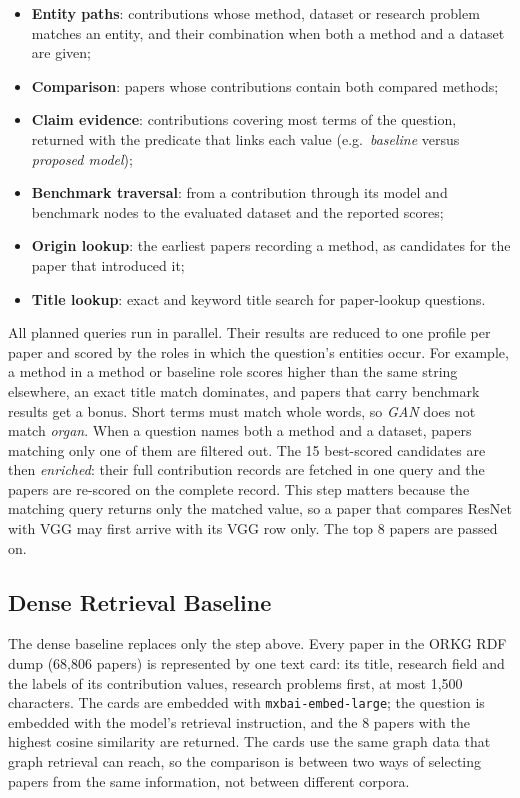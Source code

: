 \begin{itemize}
\item \textbf{Entity paths}: contributions whose method, dataset or research
  problem matches an entity, and their combination when both a method and a
  dataset are given;
\item \textbf{Comparison}: papers whose contributions contain both compared
  methods;
\item \textbf{Claim evidence}: contributions covering most terms of the
  question, returned with the predicate that links each value (e.g.\
  \emph{baseline} versus \emph{proposed model});
\item \textbf{Benchmark traversal}: from a contribution through its model and
  benchmark nodes to the evaluated dataset and the reported scores;
\item \textbf{Origin lookup}: the earliest papers recording a method, as
  candidates for the paper that introduced it;
\item \textbf{Title lookup}: exact and keyword title search for paper-lookup
  questions.
\end{itemize}

All planned queries run in parallel. Their results are reduced to one
profile per paper and scored by the roles in which the question's entities
occur. For example, a method in a method or baseline role scores higher than
the same string elsewhere, an exact title match dominates, and papers that
carry benchmark results get a bonus. Short terms must match whole words, so
\emph{GAN} does not match \emph{organ}. When a question names both a method and
a dataset, papers matching only one of them are filtered out. The 15
best-scored candidates are then \emph{enriched}: their full contribution
records are fetched in one query and the papers are re-scored on the complete
record. This step matters because the matching query returns only the matched
value, so a paper that compares ResNet with VGG may first arrive with its VGG
row only. The top 8 papers are passed on.

\subsection{Dense Retrieval Baseline}

The dense baseline replaces only the step above. Every paper in the ORKG RDF dump
(68,806 papers) is represented by one text card: its title, research field
and the labels of its contribution values, research problems first, at most
1,500 characters. The cards are embedded with \texttt{mxbai-embed-large};
the question is embedded with the model's retrieval instruction, and the 8
papers with the highest cosine similarity are returned. The cards use the
same graph data that graph retrieval can reach, so the comparison is between
two ways of selecting papers from the same information, not between different
corpora.

